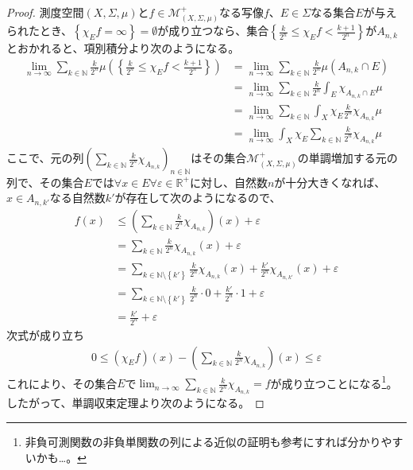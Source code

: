 \documentclass[dvipdfmx]{jsarticle}
\begin{document}
\begin{proof}
測度空間$(X,\varSigma,\mu)$と$f \in \mathcal{M}_{(X,\varSigma,\mu)}^{+}$なる写像$f$、$E \in \varSigma$なる集合$E$が与えられたとき、$\left\{ \chi_{E}f = \infty \right\} = \emptyset$が成り立つなら、集合$\left\{ \frac{k}{2^{n}} \leq \chi_{E}f < \frac{k + 1}{2^{n}} \right\}$が$A_{n,k}$とおかれると、項別積分より次のようになる。
\begin{align*}
\lim_{n \rightarrow \infty}{\sum_{k \in \mathbb{N}} {\frac{k}{2^{n}}\mu\left( \left\{ \frac{k}{2^{n}} \leq \chi_{E}f < \frac{k + 1}{2^{n}} \right\} \right)}} &= \lim_{n \rightarrow \infty}{\sum_{k \in \mathbb{N}} {\frac{k}{2^{n}}\mu\left( A_{n,k} \cap E \right)}}\\
&= \lim_{n \rightarrow \infty}{\sum_{k \in \mathbb{N}} {\frac{k}{2^{n}}\int_{E} {\chi_{A_{n,k} \cap E}\mu}}}\\
&= \lim_{n \rightarrow \infty}{\sum_{k \in \mathbb{N}} {\int_{X} {\chi_{E}\frac{k}{2^{n}}\chi_{A_{n,k}}\mu}}}\\
&= \lim_{n \rightarrow \infty}{\int_{X} {\chi_{E}\sum_{k \in \mathbb{N}} {\frac{k}{2^{n}}\chi_{A_{n,k}}}\mu}}
\end{align*}
ここで、元の列$\left( \sum_{k \in \mathbb{N}} {\frac{k}{2^{n}}\chi_{A_{n,k}}} \right)_{n \in \mathbb{N}}$はその集合$\mathcal{M}_{(X,\varSigma,\mu)}^{+}$の単調増加する元の列で、その集合$E$では$\forall x \in E\forall\varepsilon \in \mathbb{R}^{+}$に対し、自然数$n$が十分大きくなれば、$x \in A_{n,k'}$なる自然数$k'$が存在して次のようになるので、
\begin{align*}
f(x) &\leq \left( \sum_{k \in \mathbb{N}} {\frac{k}{2^{n}}\chi_{A_{n,k}}} \right)(x) + \varepsilon\\
&= \sum_{k \in \mathbb{N}} {\frac{k}{2^{n}}\chi_{A_{n,k}}(x)} + \varepsilon\\
&= \sum_{k \in \mathbb{N} \setminus \left\{ k' \right\}} {\frac{k}{2^{n}}\chi_{A_{n,k}}(x)} + \frac{k'}{2^{n}}\chi_{A_{n,k'}}(x) + \varepsilon\\
&= \sum_{k \in \mathbb{N} \setminus \left\{ k' \right\}} {\frac{k}{2^{n}} \cdot 0} + \frac{k'}{2^{n}} \cdot 1 + \varepsilon\\
&= \frac{k'}{2^{n}} + \varepsilon
\end{align*}
次式が成り立ち
\begin{align*}
0 \leq \left( \chi_{E}f \right)(x) - \left( \sum_{k \in \mathbb{N}} {\frac{k}{2^{n}}\chi_{A_{n,k}}} \right)(x) \leq \varepsilon
\end{align*}
これにより、その集合$E$で$\lim_{n \rightarrow \infty}{\sum_{k \in \mathbb{N}} {\frac{k}{2^{n}}\chi_{A_{n,k}}}} = f$が成り立つことになる\footnote{非負可測関数の非負単関数の列による近似の証明も参考にすれば分かりやすいかも…。}。したがって、単調収束定理より次のようになる。

\end{proof}
\end{document}

